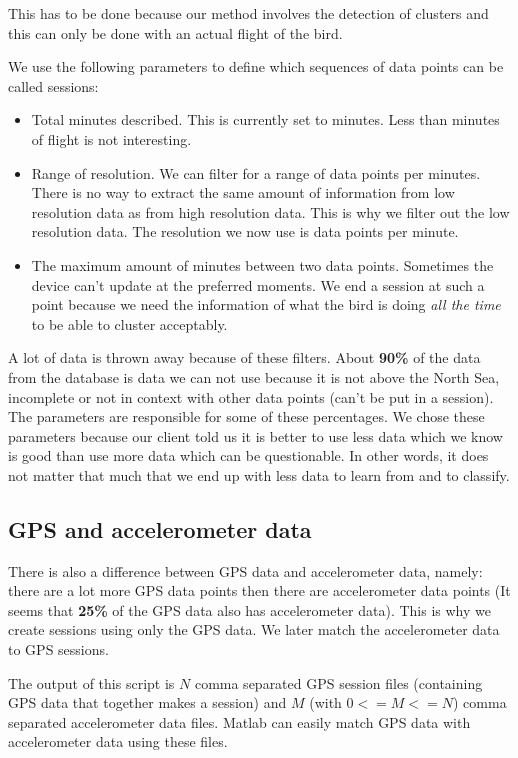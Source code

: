 This has to be done because our method involves the detection of clusters and this
can only be done with an actual flight of the bird. 

We use the following parameters to define which sequences of data points can be called sessions: 
\begin{itemize}
    \item Total minutes described. This is currently set to \minimumSessionLengthMinutes minutes. Less than \minimumSessionLengthMinutes minutes of flight is not interesting.
    \item Range of resolution. We can filter for a range of data points per minutes. There is
no way to extract the same amount of information from low resolution data as from high 
resolution data. This is why we filter out the low resolution data. The resolution 
we now use is \resolutionRange data points per minute.
    \item The maximum amount of minutes between two data points. Sometimes the device
can't update at the preferred moments. We end a session at such a point because we need
the information of what the bird is doing \emph{all the time} to be able to cluster 
acceptably. 
\end{itemize}

A lot of data is thrown away because of these filters. About \textbf{90\%} of the data 
from the database is data we can not use because it is not above the North Sea, incomplete
or not in context with other data points (can't be put in a session). The parameters are  
responsible for 
some of these percentages. We chose these parameters because our client told us it is better
to use less data which we know is good than use more data which can be questionable. In 
other words, it does not matter that much that we end up with less data to learn from and
to classify. 

\subsection{GPS and accelerometer data}
\label{subsec:gpsAndAccelerometerData}
There is also a difference between GPS data and accelerometer data, namely: there are a lot
more GPS data points then there are accelerometer data points
(It seems that \textbf{25\%} of the GPS data also has accelerometer data).
This is why we create 
sessions using only
the GPS data. We later match the accelerometer data to GPS sessions. 

The output of this
script is $N$ comma separated GPS session files (containing GPS data that together makes
a session) and $M$ (with $0 <= M <= N$) comma separated accelerometer data files. Matlab
can easily match GPS data with accelerometer data using these files. 




